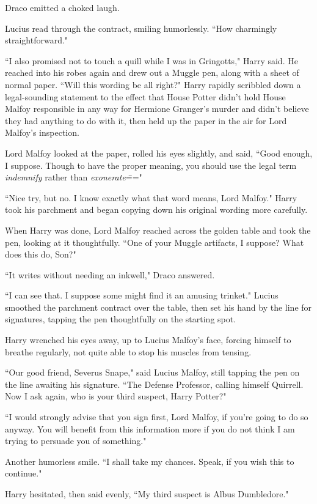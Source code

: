 Draco emitted a choked laugh.

Lucius read through the contract, smiling humorlessly. ``How charmingly straightforward."

``I also promised not to touch a quill while I was in Gringotts," Harry said. He reached into his robes again and drew out a Muggle pen, along with a sheet of normal paper. ``Will this wording be all right?" Harry rapidly scribbled down a legal-sounding statement to the effect that House Potter didn't hold House Malfoy responsible in any way for Hermione Granger's murder and didn't believe they had anything to do with it, then held up the paper in the air for Lord Malfoy's inspection.

Lord Malfoy looked at the paper, rolled his eyes slightly, and said, ``Good enough, I suppose. Though to have the proper meaning, you should use the legal term \emph{indemnify} rather than \emph{exonerate}\==="

``Nice try, but no. I know exactly what that word means, Lord Malfoy." Harry took his parchment and began copying down his original wording more carefully.

When Harry was done, Lord Malfoy reached across the golden table and took the pen, looking at it thoughtfully. ``One of your Muggle artifacts, I suppose? What does this do, Son?"

``It writes without needing an inkwell," Draco answered.

``I can see that. I suppose some might find it an amusing trinket." Lucius smoothed the parchment contract over the table, then set his hand by the line for signatures, tapping the pen thoughtfully on the starting spot.

Harry wrenched his eyes away, up to Lucius Malfoy's face, forcing himself to breathe regularly, not quite able to stop his muscles from tensing.

``Our good friend, Severus Snape," said Lucius Malfoy, still tapping the pen on the line awaiting his signature. ``The Defense Professor, calling himself Quirrell. Now I ask again, who is your third suspect, Harry Potter?"

``I would strongly advise that you sign first, Lord Malfoy, if you're going to do so anyway. You will benefit from this information more if you do not think I am trying to persuade you of something."

Another humorless smile. ``I shall take my chances. Speak, if you wish this to continue."

Harry hesitated, then said evenly, ``My third suspect is Albus Dumbledore."

